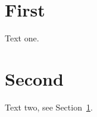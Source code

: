 \documentclass{article}
\begin{document}
\tableofcontents
\section{First}\label{sec:first}
Text one.
\section{Second}
Text two, see Section~\ref{sec:first}.
\end{document}
